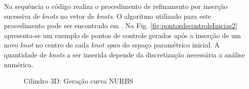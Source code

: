 \documentclass[tese_patricia]{subfiles}
\begin{document}
Na sequência o código realiza o procedimento de refinamento por inserção sucessiva de \textit{knots} no vetor de \textit{knots}. O algoritmo utilizado para este procedimento pode ser encontrado em . Na Fig. \ref{fig:pontosdecontroleInicias2} apresenta-se um exemplo de pontos de controle gerados após a inserção de um novo \textit{knot} no centro de cada \textit{knot span} do espaço paramétrico inicial. A quantidade de \textit{knots} a ser inserida depende da discretização necessária a análise numérica.

\begin{figure}[!htb]
	\centering	
	\caption{Cilindro 3D: Geração curva NURBS}
\end{figure}
\end{document}
